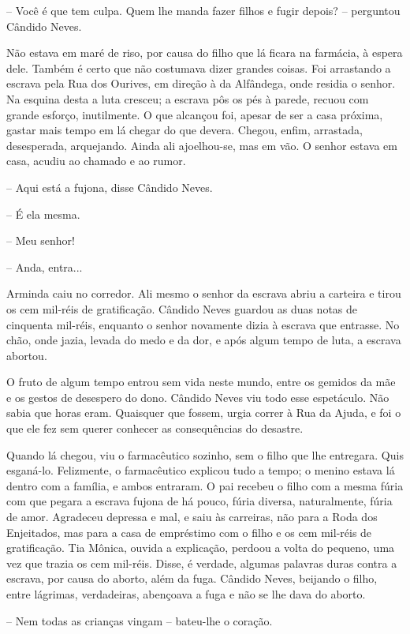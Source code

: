-- Você é que tem culpa. Quem lhe manda fazer filhos e fugir depois? --
perguntou Cândido Neves.

Não estava em maré de riso, por causa do filho que lá ficara na
farmácia, à espera dele. Também é certo que não costumava dizer grandes
coisas. Foi arrastando a escrava pela Rua dos Ourives, em direção à da
Alfândega, onde residia o senhor. Na esquina desta a luta cresceu; a
escrava pôs os pés à parede, recuou com grande esforço, inutilmente. O
que alcançou foi, apesar de ser a casa próxima, gastar mais tempo em lá
chegar do que devera. Chegou, enfim, arrastada, desesperada, arquejando.
Ainda ali ajoelhou-se, mas em vão. O senhor estava em casa, acudiu ao
chamado e ao rumor.

-- Aqui está a fujona, disse Cândido Neves.

-- É ela mesma.

-- Meu senhor!

-- Anda, entra...

Arminda caiu no corredor. Ali mesmo o senhor da escrava abriu a carteira
e tirou os cem mil-réis de gratificação. Cândido Neves guardou as duas
notas de cinquenta mil-réis, enquanto o senhor novamente dizia à escrava
que entrasse. No chão, onde jazia, levada do medo e da dor, e após algum
tempo de luta, a escrava abortou.

O fruto de algum tempo entrou sem vida neste mundo, entre os gemidos da
mãe e os gestos de desespero do dono. Cândido Neves viu todo esse
espetáculo. Não sabia que horas eram. Quaisquer que fossem, urgia correr
à Rua da Ajuda, e foi o que ele fez sem querer conhecer as consequências
do desastre.

Quando lá chegou, viu o farmacêutico sozinho, sem o filho que lhe
entregara. Quis esganá-lo. Felizmente, o farmacêutico explicou tudo a
tempo; o menino estava lá dentro com a família, e ambos entraram. O pai
recebeu o filho com a mesma fúria com que pegara a escrava fujona de há
pouco, fúria diversa, naturalmente, fúria de amor. Agradeceu depressa e
mal, e saiu às carreiras, não para a Roda dos Enjeitados, mas para a
casa de empréstimo com o filho e os cem mil-réis de gratificação. Tia
Mônica, ouvida a explicação, perdoou a volta do pequeno, uma vez que
trazia os cem mil-réis. Disse, é verdade, algumas palavras duras contra
a escrava, por causa do aborto, além da fuga. Cândido Neves, beijando o
filho, entre lágrimas, verdadeiras, abençoava a fuga e não se lhe dava
do aborto.

-- Nem todas as crianças vingam ­-- bateu-lhe o coração.


